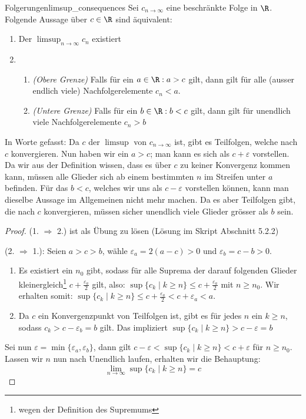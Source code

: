 \begin{lemma}{Folgerungen}{limsup_consequences}
Sei $c_{n \to \infty}$ eine beschränkte Folge in $\R$. Folgende Aussage über $c \in \R$ sind äquivalent:
\begin{enumerate}
    \item Der $\limsup_{n \to \infty} c_n$ existiert
    \item \begin{enumerate}
        \item \textit{(Obere Grenze)} Falls für ein $a \in \R: a > c$ gilt, dann gilt für alle (ausser endlich viele) Nachfolgerelemente $c_n < a$.
        \item \textit{(Untere Grenze)} Falls für ein $b \in \R: b < c$ gilt, dann gilt für unendlich viele Nachfolgerelemente $c_n > b$
    \end{enumerate}
\end{enumerate}
\end{lemma}
In Worte gefasst: Da $c$ der $\limsup$ von $c_{n \to \infty}$ ist, gibt es Teilfolgen, welche nach $c$ konvergieren. Nun haben wir ein $a > c$; man kann es sich als $c + \varepsilon$ vorstellen. Da wir aus der Definition wissen, dass es über $c$ zu keiner Konvergenz kommen kann, müssen alle Glieder sich ab einem bestimmten $n$ im Streifen unter $a$ befinden. Für das $b<c$, welches wir uns als $c - \varepsilon$ vorstellen können, kann man dieselbe Aussage im Allgemeinen nicht mehr machen. Da es aber Teilfolgen gibt, die nach $c$ konvergieren, müssen sicher unendlich viele Glieder grösser als $b$ sein. 

\begin{proof} (1. $\Longrightarrow$ 2.) ist als Übung zu lösen (Lösung im Skript Abschnitt 5.2.2)

(2. $\Longrightarrow$ 1.): Seien $a > c > b$, wähle $\varepsilon_a = 2(a - c) > 0$ und $\varepsilon_b = c - b > 0$.
\begin{enumerate}[label=(\alph*)]
    \item Es existiert ein $n_0$ gibt, sodass für alle Suprema der darauf folgenden Glieder kleinergleich\footnote{wegen der Definition des Supremums} $c + \frac{\varepsilon_a}{2}$ gilt, also:  $\sup \{c_k \mid k \geq n\} \leq c + \frac{\varepsilon_a}{2}$ mit $n \geq n_0$. Wir erhalten somit: $\sup \{c_k \mid k \geq n\} \leq c + \frac{\varepsilon_a}{2} < c + \varepsilon_a < a$.
    \item Da $c$ ein Konvergenzpunkt von Teilfolgen ist, gibt es für jedes $n$ ein $k \geq n$, sodass $c_k > c - \varepsilon_b = b$ gilt. Das impliziert $\sup \{c_k \mid k \geq n \}> c - \varepsilon = b$
\end{enumerate}
Sei nun $\varepsilon = \min\{\varepsilon_a, \varepsilon_b\}$, dann gilt $c-\varepsilon < \sup\{c_k \mid k \geq n\} < c+\varepsilon$ für $n \geq n_0$. Lassen wir $n$ nun nach Unendlich laufen, erhalten wir die Behauptung:
$$\lim_{n \to \infty}{\sup \{c_k \mid k \geq n\}} = c$$
\end{proof}

